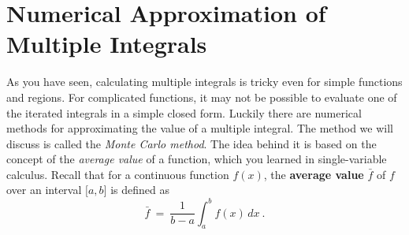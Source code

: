 \section{Numerical Approximation of Multiple Integrals}
\label{sec:Numerical Approximation of Multiple Integrals}
As you have seen, calculating multiple integrals is tricky even for simple functions and regions. For complicated
functions, it may not be possible to evaluate one of the iterated integrals in a simple closed form. Luckily there
are numerical methods for approximating the value of a multiple integral. The method we will discuss is called the
\emph{Monte Carlo method}. The idea behind it is based on the concept of the \emph{average value} of a function, which
you learned in single-variable calculus. Recall that for a continuous function $f(x)$, the \textbf{average value}
$\bar{f}$ of $f$ over an interval $\lbrack a,b \rbrack$ is defined
as
\begin{equation}\label{eqn:favg}
 \bar{f} ~=~ \frac{1}{b-a}\int_a^b f(x)\,dx ~.
\end{equation}


